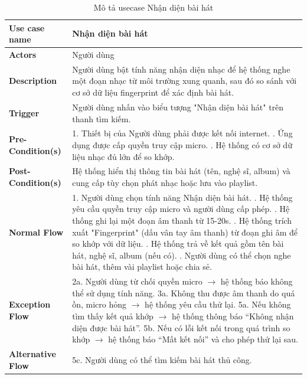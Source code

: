 \documentclass[a4paper]{article}
\begin{document}
\begin{table}[h!]
\centering
\renewcommand{\arraystretch}{1.3} %
\begin{tabularx}{\textwidth}{|l|X|}
\hline
\textbf{Use case name} & Nhận diện bài hát \\ \hline
\textbf{Actors}        & Người dùng \\ \hline
\textbf{Description}   & Người dùng bật tính năng nhận diện nhạc để hệ thống nghe một đoạn nhạc từ môi trường xung quanh, sau đó so sánh với cơ sở dữ liệu fingerprint để xác định bài hát. \\ \hline
\textbf{Trigger}       & Người dùng nhấn vào biểu tượng "Nhận diện bài hát" trên thanh tìm kiếm. \\ \hline
\textbf{Pre-Condition(s)} 
& 1. Thiết bị của Người dùng phải được kết nối internet. \newline
  2. Ứng dụng được cấp quyền truy cập micro. \newline
  3. Hệ thống có cơ sở dữ liệu nhạc đủ lớn để so khớp. \\ \hline
\textbf{Post-Condition(s)} 
& Hệ thống hiển thị thông tin bài hát (tên, nghệ sĩ, album) và cung cấp tùy chọn phát nhạc hoặc lưu vào playlist. \\ \hline
\textbf{Normal Flow}   
& 1. Người dùng chọn tính năng Nhận diện bài hát. \newline
  2. Hệ thống yêu cầu quyền truy cập micro và người dùng cấp phép. \newline
  3. Hệ thống ghi lại một đoạn âm thanh từ 15-20s. \newline
  4. Hệ thống trích xuất "Fingerprint" (dấu vân tay âm thanh) từ đoạn ghi âm để so khớp với dữ liệu. \newline
  5. Hệ thống trả về kết quả gồm tên bài hát, nghệ sĩ, album (nếu có). \newline
  6. Người dùng có thể chọn nghe bài hát, thêm vài playlist hoặc chia sẻ. \\ \hline
\textbf{Exception Flow} 
& 2a. Người dùng từ chối quyền micro $\rightarrow$ hệ thống báo không thể sử dụng tính năng. \newline
  3a. Không thu được âm thanh do quá ồn, micro hỏng $\rightarrow$ hệ thống yêu cầu thử lại. \newline
  5a. Nếu không tìm thấy kết quả khớp $\rightarrow$ hệ thống thông báo “Không nhận diện được bài hát”. \newline
  5b. Nếu có lỗi kết nối trong quá trình so khớp $\rightarrow$ hệ thống báo “Mất kết nối” và cho phép thử lại sau. \\ \hline
\textbf{Alternative Flow} 
& 5c. Người dùng có thể tìm kiếm bài hát thủ công. \\ \hline
\end{tabularx}
\caption{Mô tả usecase Nhận diện bài hát}
\end{table}
\end{document}
